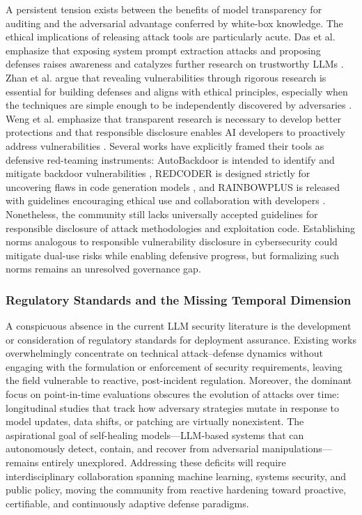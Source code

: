 \documentclass[11pt,a4paper]{article}
\begin{document}
A persistent tension exists between the benefits of model transparency for auditing and the adversarial advantage conferred by white-box knowledge. The ethical implications of releasing attack tools are particularly acute. Das et al. emphasize that exposing system prompt extraction attacks and proposing defenses raises awareness and catalyzes further research on trustworthy LLMs \cite{Das_2025_System_cda316c4}. Zhan et al. argue that revealing vulnerabilities through rigorous research is essential for building defenses and aligns with ethical principles, especially when the techniques are simple enough to be independently discovered by adversaries \cite{Zhan_2025_LLM_ab9a7822}. Weng et al. emphasize that transparent research is necessary to develop better protections and that responsible disclosure enables AI developers to proactively address vulnerabilities \cite{Weng_2025_LLMs_9f971db3}. Several works have explicitly framed their tools as defensive red-teaming instruments: AutoBackdoor is intended to identify and mitigate backdoor vulnerabilities \cite{Li_2025_LLM_29a3a9ff}, REDCODER is designed strictly for uncovering flaws in code generation models \cite{Mo_2025_LLMs_eccb86af}, and RAINBOWPLUS is released with guidelines encouraging ethical use and collaboration with developers \cite{Dang_2025_Rainbowplus_b158c5a2}. Nonetheless, the community still lacks universally accepted guidelines for responsible disclosure of attack methodologies and exploitation code. Establishing norms analogous to responsible vulnerability disclosure in cybersecurity could mitigate dual-use risks while enabling defensive progress, but formalizing such norms remains an unresolved governance gap.

\subsubsection{Regulatory Standards and the Missing Temporal Dimension}

A conspicuous absence in the current LLM security literature is the development or consideration of regulatory standards for deployment assurance. Existing works overwhelmingly concentrate on technical attack--defense dynamics without engaging with the formulation or enforcement of security requirements, leaving the field vulnerable to reactive, post-incident regulation. Moreover, the dominant focus on point-in-time evaluations obscures the evolution of attacks over time: longitudinal studies that track how adversary strategies mutate in response to model updates, data shifts, or patching are virtually nonexistent. The aspirational goal of self-healing models---LLM-based systems that can autonomously detect, contain, and recover from adversarial manipulations---remains entirely unexplored. Addressing these deficits will require interdisciplinary collaboration spanning machine learning, systems security, and public policy, moving the community from reactive hardening toward proactive, certifiable, and continuously adaptive defense paradigms.
\end{document}
